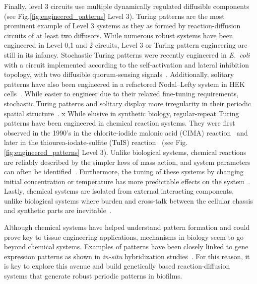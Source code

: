Finally, level 3 circuits use multiple dynamically regulated diffusible components (see Fig.\ref{fig:engineered_patterns} Level 3).
Turing patterns are the most prominent example of Level 3 systems as they as formed by reaction-diffusion circuits of at least two diffusors.
While numerous robust systems have been engineered in Level 0,1 and 2 circuits, Level 3 or Turing pattern engineering are still in its infancy.
Stochastic Turing patterns were recently engineered in \textit{E.~coli} with a circuit implemented according to the self-activation and lateral inhibition topology, with two diffusible quorum-sensing signals~\parencite{Karig2018}.
Additionally, solitary patterns have also been engineered in a refactored Nodal–Lefty system in HEK cells~\parencite{Sekine2018}.
While easier to engineer due to their relaxed fine-tuning requirements, stochastic Turing patterns and solitary display more irregularity in their periodic spatial structure~\parencite{Butler2011, Karig2018,Sekine2018}.
x
While elusive in synthetic biology, regular-repeat Turing patterns have been engineered in chemical reaction systems.
They were first observed in the 1990's in the chlorite-iodide malonic acid (CIMA) reaction~\parencite{Castets, Lengyel1992} and later in the thiourea-iodate-sulfite (TuIS) reaction~\parencite{Horvath} (see Fig. \ref{fig:engineered_patterns} Level 3).
Unlike biological systems, chemical reactions are reliably described by the simpler laws of mass action, and system parameters can often be identified~\parencite{turanyi1994, kugler2009, Pusnik2019, Yeoh2019}.
Furthermore, the tuning of these systems by changing initial concentration or temperature has more predictable effects on the system~\parencite{Horvath, landeira2010, Asakura2011}.
Lastly, chemical systems are isolated from external interacting components, unlike biological systems where burden and cross-talk between the cellular chassis and synthetic parts are inevitable~\parencite{Ceroni2015, Nielsen2016,Butzin2018, Du2020}.


Although chemical systems have helped understand pattern formation and could prove key to tissue engineering applications, mechanisms in biology seem to go beyond chemical systems.
Examples of patterns have been closely linked to gene expression patterns as shown in \textit{in-situ} hybridization studies~\parencite{Jing2006}.
For this reason, it is key to explore this avenue and build genetically based reaction-diffusion systems that generate robust periodic patterns in biofilms.



